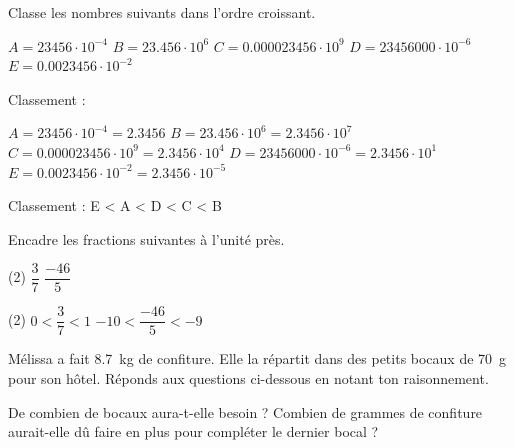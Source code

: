 \documentclass[parskip=half-,twoside=semi, DIV=12, 12pt]{scrartcl}
\begin{document}
\begin{transferer}[points=2]
    Classe les nombres suivants dans l'ordre croissant.
    \begin{tasks}[label=, item-indent=0pt]
        \task \(A= \num{23456} \cdot 10^{- 4} \)
        \task \(B= \num{23,456} \cdot 10^{6}\)
        \task \(C= \num{0,000023456} \cdot 10^{9}\)
        \task \(D= \num{23456000} \cdot 10^{- 6}\)
        \task \(E= \num{0,0023456} \cdot 10^{- 2}\)
    \end{tasks}
    Classement :
\end{transferer}
\begin{soltransferer}
    \begin{tasks}[label=]
        \task \(A= \num{23456} \cdot 10^{- 4} = \num{2,3456}\)
        \task \(B= \num{23,456} \cdot 10^{6} = \num{2,3456} \cdot 10^7\)
        \task \(C= \num{0,000023456} \cdot 10^{9}= \num{2,3456}\cdot 10^4\)
        \task \(D= \num{23456000} \cdot 10^{- 6}= \num{2,3456}\cdot 10^1\)
        \task \(E= \num{0,0023456} \cdot 10^{- 2}= \num{2,3456}\cdot 10^{-5}\)
    \end{tasks}
    Classement : E < A < D < C < B
\end{soltransferer}
\begin{appliquer}[points=2]
    Encadre les fractions suivantes à l'unité près.
    \begin{tasks}(2)
        \task \hfil\(\dfrac{3}{7}\)
        \task \hfil\(\dfrac{-46}{5}\)
    \end{tasks}
    \vspace{1cm}
\end{appliquer}
\begin{solappliquer}
    \begin{tasks}(2)
        \task \(0<\dfrac{3}{7}<1\)
        \task \(-10<\dfrac{-46}{5}<-9\)
    \end{tasks}
\end{solappliquer}
\newpage
\begin{transferer}[points=3]
    Mélissa a fait \SI{8,7}{kg} de confiture. Elle la répartit dans des
    petits bocaux de \SI{70}{g} pour son hôtel. Réponds aux questions ci-dessous en notant ton raisonnement.
    \begin{tasks}[after-item-skip=6cm, after-skip=3cm]
        \task De combien de bocaux aura-t-elle besoin ?
        \task Combien de grammes de confiture aurait-elle dû faire en plus pour compléter le dernier bocal ?
    \end{tasks}
\end{transferer}
\end{document}
